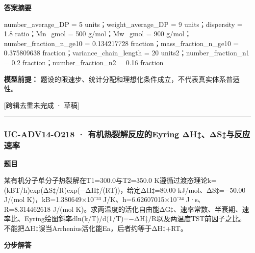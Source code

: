 \documentclass[UTF8,11pt,a4paper]{ctexart}
\begin{document}
\noindent\textbf{答案摘要}\par
number\_average\_DP = 5 units；weight\_average\_DP = 9 units；dispersity = 1.8 ratio；Mn\_gmol = 500 g/mol；Mw\_gmol = 900 g/mol；number\_fraction\_n\_ge10 = 0.134217728 fraction；mass\_fraction\_n\_ge10 = 0.375809638 fraction；variance\_chain\_length = 20 units2；number\_fraction\_n1 = 0.2 fraction；number\_fraction\_n2 = 0.16 fraction\par
\noindent\textbf{模型前提：}
题设的限速步、统计分配和理想化条件成立，不代表真实体系普适性。\par
\noindent\textcolor{red!65!black}{[跨辑去重未完成 · 草稿]} \par
\medskip\hrule\medskip
{}
\subsubsection*{UC-ADV14-O218 · 有机热裂解反应的Eyring ΔH‡、ΔS‡与反应速率}
\noindent\textbf{题目}\par
某有机分子单分子热裂解在T1=300.0与T2=350.0 K遵循过渡态理论k=(kBT/h)exp(ΔS‡/R)exp(−ΔH‡/(RT))，给定ΔH‡=80.00 kJ/mol、ΔS‡=−50.00 J/(mol K)，kB=1.380649×10⁻²³ J/K、h=6.62607015×10⁻³⁴ J·s、R=8.314462618 J/(mol K)。求两温度的活化自由能ΔG‡、速率常数、半衰期、速率比、Eyring绘图斜率dln(k/T)/d(1/T)=−ΔH‡/R以及两温度TST前因子之比。不能把ΔH‡误当Arrhenius活化能Ea，后者约等于ΔH‡+RT。\par
\medskip\noindent\textbf{分步解答}
\end{document}

